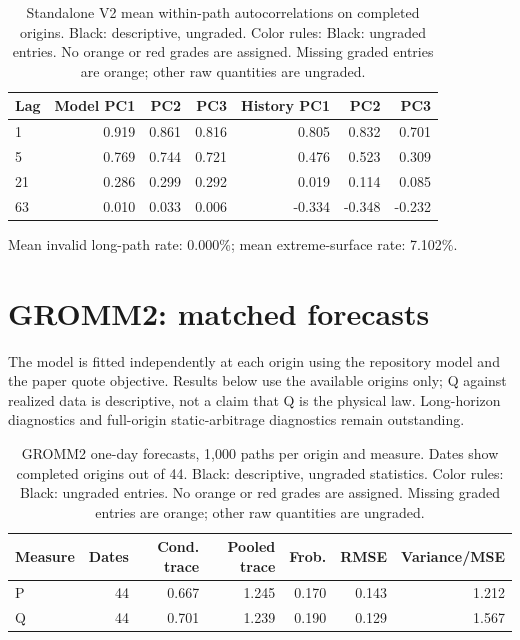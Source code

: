 \documentclass[11pt]{article}
\begin{document}
\begin{table}[H]\centering\small\setlength{\tabcolsep}{4pt}
\caption{Standalone V2 mean within-path autocorrelations on completed origins. Black: descriptive, ungraded. Color rules: Black: ungraded entries. No orange or red grades are assigned. Missing graded entries are orange; other raw quantities are ungraded.}\label{tab:standalone-v2-acf}
\begin{tabular}{@{}lrrrrrr@{}}
\toprule
Lag & Model PC1 & PC2 & PC3 & History PC1 & PC2 & PC3 \\
\midrule
1 & 0.919 & 0.861 & 0.816 & 0.805 & 0.832 & 0.701 \\
5 & 0.769 & 0.744 & 0.721 & 0.476 & 0.523 & 0.309 \\
21 & 0.286 & 0.299 & 0.292 & 0.019 & 0.114 & 0.085 \\
63 & 0.010 & 0.033 & 0.006 & -0.334 & -0.348 & -0.232 \\
\bottomrule\end{tabular}\end{table}

Mean invalid long-path rate: 0.000\%; mean extreme-surface rate: 7.102\%.

\section{GROMM2: matched forecasts}

The model is fitted independently at each origin using the repository model and the paper quote objective. Results below use the available origins only; Q against realized data is descriptive, not a claim that Q is the physical law. Long-horizon diagnostics and full-origin static-arbitrage diagnostics remain outstanding.

\begin{table}[H]\centering\small\setlength{\tabcolsep}{4pt}
\caption{GROMM2 one-day forecasts, 1,000 paths per origin and measure. Dates show completed origins out of 44. Black: descriptive, ungraded statistics. Color rules: Black: ungraded entries. No orange or red grades are assigned. Missing graded entries are orange; other raw quantities are ungraded.}\label{tab:gromm2-partial}
\begin{tabular}{@{}lrrrrrr@{}}
\toprule
Measure & Dates & Cond. trace & Pooled trace & Frob. & RMSE & Variance/MSE \\
\midrule
P & 44 & 0.667 & 1.245 & 0.170 & 0.143 & 1.212 \\
Q & 44 & 0.701 & 1.239 & 0.190 & 0.129 & 1.567 \\
\bottomrule\end{tabular}\end{table}
\end{document}
